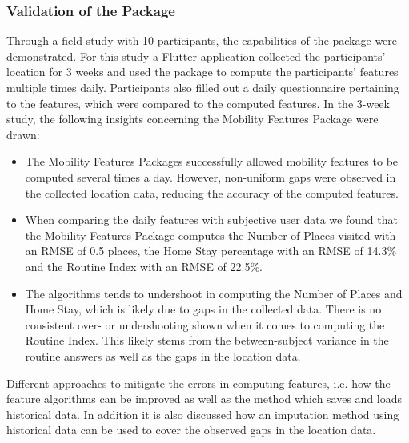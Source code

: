 \subsubsection*{Validation of the Package}
Through a field study with 10 participants, the capabilities of the package were demonstrated. For this study a Flutter application collected the participants' location for 3 weeks and used the package to compute the participants' features multiple times daily. Participants also filled out a daily questionnaire pertaining to the features, which were compared to the computed features. In the 3-week study, the following insights concerning the Mobility Features Package were drawn:

\begin{itemize}
    \item The Mobility Features Packages successfully allowed mobility features to be computed several times a day. However, non-uniform gaps were observed in the collected location data, reducing the accuracy of the computed features. 
    
    \item When comparing the daily features with subjective user data we found that the Mobility Features Package computes the Number of Places visited with an RMSE of 0.5 places, the Home Stay percentage with an RMSE of 14.3\% and the Routine Index with an RMSE of 22.5\%.
    
    \item The algorithms tends to undershoot in computing the Number of Places and Home Stay, which is likely due to gaps in the collected data. There is no consistent over- or undershooting shown when it comes to computing the Routine Index. This likely stems from the between-subject variance in the routine answers as well as the gaps in the location data.
\end{itemize}

Different approaches to mitigate the errors in computing features, i.e. how the feature algorithms can be improved as well as the method which saves and loads historical data. In addition it is also discussed how an imputation method using historical data can be used to cover the observed gaps in the location data.